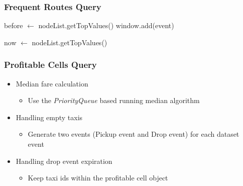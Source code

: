 \documentclass[handout]{beamer}
\begin{document}
\begin{frame}
\frametitle{Frequent Routes Query}

\begin{algorithm}[H]
\footnotesize
before $\gets$ nodeList.getTopValues()\;
window.add(event)\;


now $\gets$ nodeList.getTopValues()\;


\end{algorithm}


\end{frame}

\begin{frame}
\frametitle{Profitable Cells Query}
\begin{itemize}
        \item Median fare calculation
		\begin{itemize}
			\item Use the \textit{PriorityQueue} based running median algorithm
		\end{itemize}
        \item Handling empty taxis
		\begin{itemize}
                        \item Generate two events (Pickup event and Drop event) for each dataset event
                \end{itemize}
        \item Handling drop event expiration
		\begin{itemize}
                        \item Keep taxi ids within the profitable cell object
                \end{itemize}
\end{itemize}

\end{frame}
\end{document}
